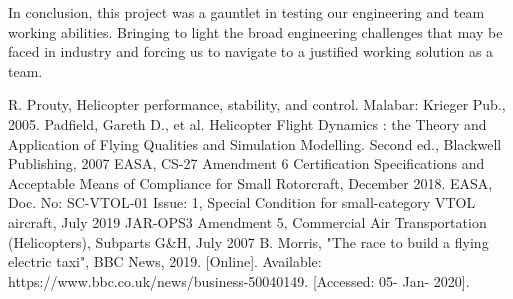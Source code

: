 \documentclass[11pt,a4paper]{article}
\begin{document}
In conclusion, this project was a gauntlet in testing our engineering and team working abilities. Bringing to light the broad engineering challenges that may be faced in industry and forcing us to navigate to a justified working solution as a team.

\begin{thebibliography}{}
R. Prouty, Helicopter performance, stability, and control. Malabar: Krieger Pub., 2005.
 Padfield, Gareth D., et al. Helicopter Flight Dynamics : the Theory and Application of Flying Qualities and
Simulation Modelling. Second ed., Blackwell Publishing, 2007
 EASA, CS-27 Amendment 6 Certification Specifications and Acceptable Means of Compliance for Small Rotorcraft, December 2018.
EASA, Doc. No: SC-VTOL-01 Issue: 1, Special Condition for small-category VTOL aircraft, July 2019
 JAR-OPS3 Amendment 5, Commercial Air Transportation (Helicopters), Subparts G&H, July 2007
B. Morris, "The race to build a flying electric taxi", BBC News, 2019. [Online]. Available: https://www.bbc.co.uk/news/business-50040149. [Accessed: 05- Jan- 2020].
\end{thebibliography}{}
\newpage
\end{document}
